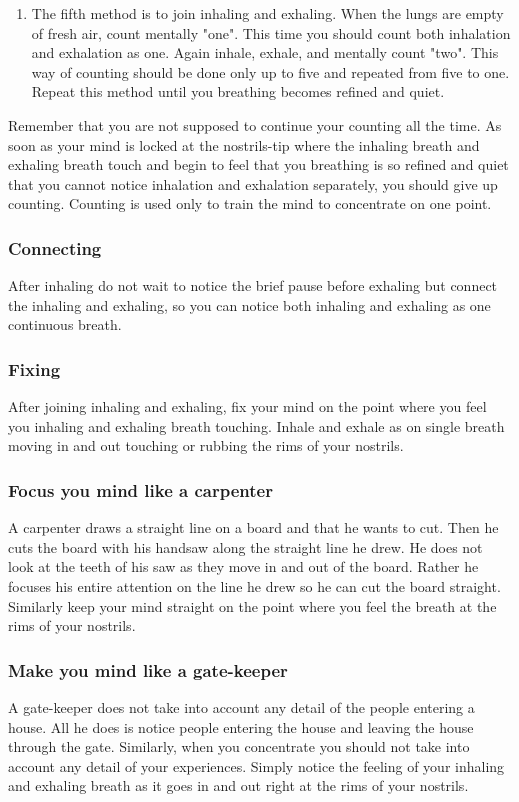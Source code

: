 \begin{enumerate}
\item The fifth method is to join inhaling and exhaling. When the lungs are empty
of fresh air, count mentally "one". This time you should count both inhalation
and exhalation as one. Again inhale, exhale, and mentally count "two". This way
of counting should be done only up to five and repeated from five to one. Repeat
this method until you breathing becomes refined and quiet.
\end{enumerate}

Remember that you are not supposed to continue your counting all the time. As
soon as your mind is locked at the nostrils-tip where the inhaling breath and
exhaling breath touch and begin to feel that you breathing is so refined and
quiet that you cannot notice inhalation and exhalation separately, you should
give up counting. Counting is used only to train the mind to concentrate on one
point.


\subsubsection*{Connecting} After inhaling do not wait to notice the brief pause before
exhaling but connect the inhaling and exhaling, so you can notice both inhaling
and exhaling as one continuous breath.

\subsubsection*{Fixing} After joining inhaling and exhaling, fix your mind on the point where
you feel you inhaling and exhaling breath touching. Inhale and exhale as on
single breath moving in and out touching or rubbing the rims of your nostrils.

\subsubsection*{Focus you mind like a carpenter} A carpenter draws a straight line on a board
and that he wants to cut. Then he cuts the board with his handsaw along the
straight line he drew. He does not look at the teeth of his saw as they move in
and out of the board. Rather he focuses his entire attention on the line he drew
so he can cut the board straight. Similarly keep your mind straight on the point
where you feel the breath at the rims of your nostrils.

\subsubsection*{Make you mind like a gate-keeper} A gate-keeper does not take into account any
detail of the people entering a house. All he does is notice people entering the
house and leaving the house through the gate. Similarly, when you concentrate
you should not take into account any detail of your experiences. Simply notice
the feeling of your inhaling and exhaling breath as it goes in and out right at
the rims of your nostrils.

